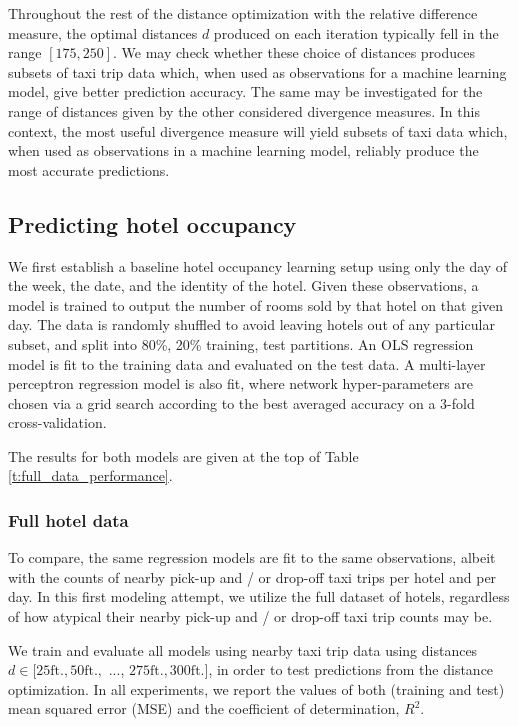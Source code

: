 \documentclass[useAMS, usenatbib]{biom}
\begin{document}
Throughout the rest of the distance optimization with the relative difference measure, the optimal distances $d$ produced on each iteration typically fell in the range $[175, 250]$. We may check whether these choice of distances produces subsets of taxi trip data which, when used as observations for a machine learning model, give better prediction accuracy. The same may be investigated for the range of distances given by the other considered divergence measures. In this context, the most useful divergence measure will yield subsets of taxi data which, when used as observations in a machine learning model, reliably produce the most accurate predictions.

\subsection{Predicting hotel occupancy}
\label{ss:predicting}

We first establish a baseline hotel occupancy learning setup using only the day of the week, the date, and the identity of the hotel. Given these observations, a model is trained to output the number of rooms sold by that hotel on that given day. The data is randomly shuffled to avoid leaving hotels out of any particular subset, and split into 80\%, 20\% training, test partitions. An OLS regression model is fit to the training data and evaluated on the test data. A multi-layer perceptron regression model is also fit, where network hyper-parameters are chosen via a grid search according to the best averaged accuracy on a 3-fold cross-validation.

The results for both models are given at the top of Table \ref{t:full_data_performance}.

\subsubsection{Full hotel data}

To compare, the same regression models are fit to the same observations, albeit with the counts of nearby pick-up and / or drop-off taxi trips per hotel and per day. In this first modeling attempt, we utilize the full dataset of hotels, regardless of how atypical their nearby pick-up and / or drop-off taxi trip counts may be.

We train and evaluate all models using nearby taxi trip data using distances $d \in [25 \mathrm{ft.}, 50 \mathrm{ft.},$ ..., $275 \mathrm{ft.}, 300 \mathrm{ft.}]$, in order to test predictions from the distance optimization. In all experiments, we report the values of both (training and test) mean squared error (MSE) and the coefficient of determination, $R^2$.
\end{document}
